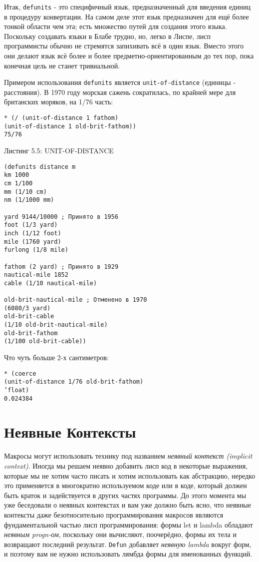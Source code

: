 Итак, \verb"defunits" - это специфичный язык, предназначенный для введения единиц в процедуру конвертации. На самом деле этот язык предназначен для ещё более тонкой области чем эта; есть множество путей для создания этого языка. Поскольку создавать языки в Блабе трудно, но, легко в Лиспе, лисп программисты обычно не стремятся запихивать всё в один язык. Вместо этого они делают язык всё более и более предметно-ориентированным до тех пор, пока конечная цель не станет тривиальной.

Примером использования \verb"defunits" является \verb"unit-of-distance" (единицы - расстояния). В 1970 году морская сажень сократилась, по крайней мере для британских моряков, на 1/76 часть:

\begin{verbatim}
* (/ (unit-of-distance 1 fathom)
(unit-of-distance 1 old-brit-fathom))
75/76
\end{verbatim}

Листинг 5.5: UNIT-OF-DISTANCE\label{listing_5.5}
\listbegin
\begin{verbatim}
(defunits distance m
km 1000
cm 1/100
mm (1/10 cm)
nm (1/1000 mm)

yard 9144/10000 ; Принято в 1956
foot (1/3 yard)
inch (1/12 foot)
mile (1760 yard)
furlong (1/8 mile)

fathom (2 yard) ; Принято в 1929
nautical-mile 1852
cable (1/10 nautical-mile)

old-brit-nautical-mile ; Отменено в 1970
(6080/3 yard)
old-brit-cable
(1/10 old-brit-nautical-mile)
old-brit-fathom
(1/100 old-brit-cable))
\end{verbatim}
\listend

Что чуть больше 2-х сантиметров:

\begin{verbatim}
* (coerce
(unit-of-distance 1/76 old-brit-fathom)
’float)
0.024384
\end{verbatim}

\section{Неявные Контексты}\label{section_implicit_contexts}

Макросы могут использовать технику под названием \emph{неявный контекст (implicit context)}. Иногда мы решаем неявно добавить лисп код в некоторые выражения, которые мы не хотим часто писать и хотим использовать как абстракцию, нередко это применяется в многократно используемом коде или в коде, который должен быть краток и задействуется в других частях программы. До этого момента мы уже беседовали о неявных контекстах и вам уже должно быть ясно, что неявные контексты даже безотносительно программирования макросов являются фундаментальной частью лисп программирования: формы let и lambda обладают \emph{неявным progn-ом}, поскольку они вычисляют, поочерёдно, формы их тела и возвращают последний результат. \verb"Defun" добавляет \emph{неявную lambda} вокруг форм, и поэтому вам не нужно использовать лямбда формы для именованных функций.

